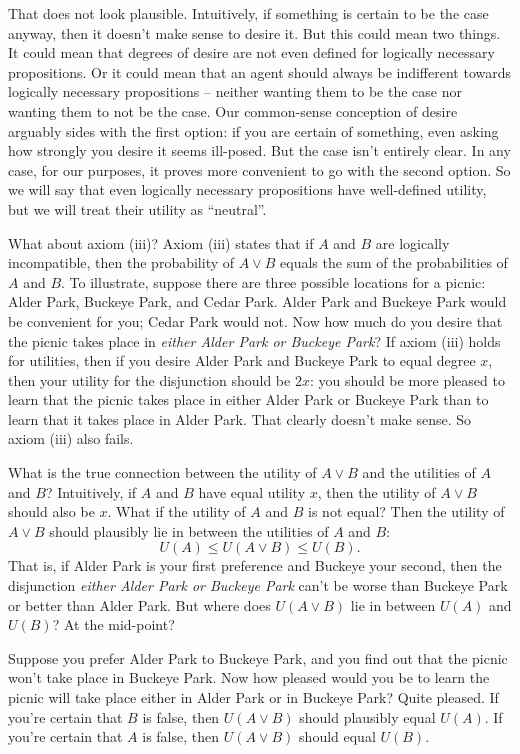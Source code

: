 That does not look plausible. Intuitively, if something is certain to
be the case anyway, then it doesn't make sense to desire it. But this
could mean two things. It could mean that degrees of desire are not
even defined for logically necessary propositions. Or it could mean
that an agent should always be indifferent towards logically necessary
propositions -- neither wanting them to be the case nor wanting them
to not be the case. Our common-sense conception of desire arguably
sides with the first option: if you are certain of something, even
asking how strongly you desire it seems ill-posed. But the case isn't
entirely clear. In any case, for our purposes, it proves more
convenient to go with the second option. So we will say that even
logically necessary propositions have well-defined utility, but we
will treat their utility as ``neutral''.

What about axiom (iii)? Axiom (iii) states that if $A$ and $B$ are
logically incompatible, then the probability of $A\lor B$ equals the
sum of the probabilities of $A$ and $B$. To illustrate, suppose there
are three possible locations for a picnic: Alder Park, Buckeye Park,
and Cedar Park. Alder Park and Buckeye Park would be convenient for
you; Cedar Park would not. Now how much do you desire that the picnic
takes place in \emph{either Alder Park or Buckeye Park}? If axiom
(iii) holds for utilities, then if you desire Alder Park and Buckeye
Park to equal degree $x$, then your utility for the disjunction should
be $2x$: you should be more pleased to learn that the picnic takes
place in either Alder Park or Buckeye Park than to learn that it takes
place in Alder Park. That clearly doesn't make sense. So axiom (iii)
also fails.

What is the true connection between the utility of $A \lor B$ and the
utilities of $A$ and $B$? Intuitively, if $A$ and $B$ have equal
utility $x$, then the utility of $A \lor B$ should also be $x$. What
if the utility of $A$ and $B$ is not equal? Then the utility of $A
\lor B$ should plausibly lie in between the utilities of $A$ and $B$:
\[
  U(A) \leq U(A \lor B) \leq U(B).
\]
That is, if Alder Park is your first preference and Buckeye your second, then
the disjunction \emph{either Alder Park or Buckeye Park} can't be
worse than Buckeye Park or better than Alder Park. But where does $U(A
\lor B)$ lie in between $U(A)$ and $U(B)$? At the mid-point?

Suppose you prefer Alder Park to Buckeye Park, and you find out that
the picnic won't take place in Buckeye Park. Now how pleased would you be
to learn the picnic will take place either in Alder Park or in Buckeye
Park? Quite pleased. If you're certain that $B$ is false, then $U(A
\lor B)$ should plausibly equal $U(A)$. If you're certain that $A$ is
false, then $U(A \lor B)$ should equal $U(B)$.

